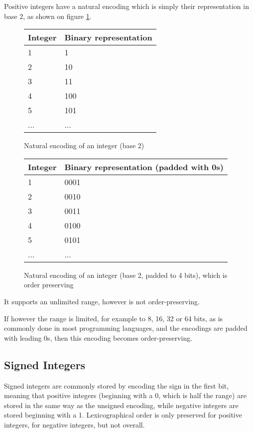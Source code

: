 \documentclass{acm_proc_article-sp}
\begin{document}
Positive integers have a natural encoding which is simply their representation in base 2, as shown on figure \ref{figure-natural-encoding}.

\begin{figure}
\caption{Natural encoding of an integer (base 2)}
\label{figure-natural-encoding}
\center
\begin{tabular}{|l|l|}
\hline
Integer & Binary representation \\
\hline
1 & 1 \\
\hline
2 & 10 \\
\hline
3 & 11 \\
\hline
4 & 100  \\
\hline
5 & 101  \\
\hline
... & ... \\
\hline
\end{tabular}
\end{figure}

\begin{figure}
\caption{Natural encoding of an integer (base 2, padded to 4 bits), which is order preserving}
\label{figure-natural-encoding-padded}
\center
\begin{tabular}{|l|l|}
\hline
Integer & Binary representation (padded with 0s) \\
\hline
1 & 0001 \\
\hline
2 & 0010 \\
\hline
3 & 0011 \\
\hline
4 & 0100 \\
\hline
5 & 0101 \\
\hline
... & ... \\
\hline
\end{tabular}
\end{figure}

It supports an unlimited range, however is not order-preserving.

If however the range is limited, for example to 8, 16, 32 or 64 bits, as is commonly done in most programming languages, and the encodings are padded with leading 0s, then this encoding becomes order-preserving.

\subsection{Signed Integers}

Signed integers are commonly stored by encoding the sign in the first bit, meaning that positive integers (beginning with a 0, which is half the range) are stored in the same way as the unsigned encoding, while negative integers are stored beginning with a 1. Lexicographical order is only preserved for positive integers, for negative integers, but not overall.
\end{document}
